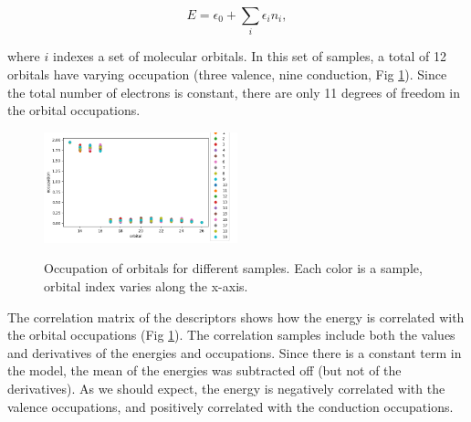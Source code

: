 \begin{equation}
E = \epsilon_0 + \sum_i \epsilon_i n_i,
\end{equation}

where $i$ indexes a set of molecular orbitals.
In this set of samples, a total of 12 orbitals have varying occupation (three valence, nine conduction, Fig \ref{fig:descriptors}).
Since the total number of electrons is constant, there are only 11 degrees of freedom in the orbital occupations.

\begin{figure}[h!]
\includegraphics[width=0.5\textwidth]{images/dmc_lowen_descriptors.png}
\label{fig:descriptors}
\caption{Occupation of orbitals for different samples. Each color is a sample, orbital index varies along the x-axis.}
\end{figure}

The correlation matrix of the descriptors shows how the energy is correlated with the orbital occupations (Fig \ref{fig:descriptors}).
The correlation samples include both the values and derivatives of the energies and occupations.
Since there is a constant term in the model, the mean of the energies was subtracted off (but not of the derivatives).
As we should expect, the energy is negatively correlated with the valence occupations, and positively correlated with the conduction occupations.

